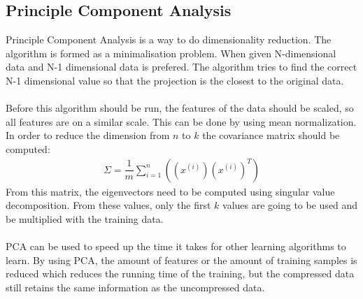 \subsection{Principle Component Analysis}
Principle Component Analysis is a way to do dimensionality reduction. The algorithm is formed as a minimalisation problem. When given N-dimensional data and N-1 dimensional data is prefered. The algorithm tries to find the correct N-1 dimensional value so that the projection is the closest to the original data. \\\\
Before this algorithm should be run, the features of the data should be scaled, so all features are on a similar scale. This can be done by using mean normalization. In order to reduce the dimension from $n$ to $k$ the covariance matrix should be computed:
\begin{align}
\Sigma = \dfrac{1}{m}\sum\limits_{i=1}^n((x^{(i)}) (x^{(i)})^T)
\end{align}
From this matrix, the eigenvectors need to be computed using singular value decomposition. From these values, only the first $k$ values are going to be used and be multiplied with the training data.\\\\
PCA can be used to speed up the time it takes for other learning algorithms to learn. By using PCA, the amount of features or the amount of training samples is reduced which reduces the running time of the training, but the compressed data still retains the same information as the uncompressed data.

